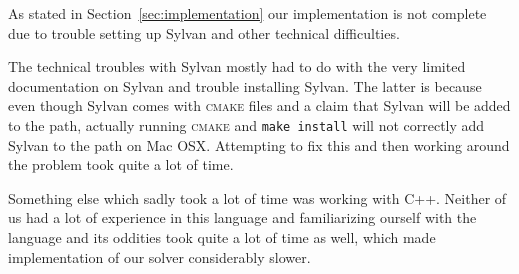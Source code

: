 As stated in Section~\ref{sec:implementation} our implementation is not
complete due to trouble setting up Sylvan and other technical difficulties.

The technical troubles with Sylvan mostly had to do with the very limited 
documentation on Sylvan and trouble installing Sylvan. The latter is because 
even though Sylvan comes with \textsc{cmake} files and a claim that Sylvan will 
be added to the path, actually running \textsc{cmake} and \texttt{make install}
will not correctly add Sylvan to the path on Mac OSX. Attempting to fix this and
then working around the problem took quite a lot of time. 

Something else which sadly took a lot of time was working with C++. Neither of
us had a lot of experience in this language and familiarizing ourself with the
language and its oddities took quite a lot of time as well, which made 
implementation of our solver considerably slower.